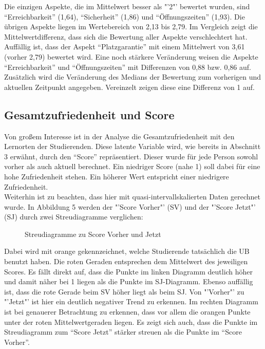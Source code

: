 \documentclass[11pt, a4paper]{article}
\begin{document}
Die einzigen Aspekte, die im Mittelwert besser als "'2"' bewertet wurden, sind “Erreichbarkeit” (1,64), “Sicherheit” (1,86) und “Öffnungszeiten” (1,93). Die übrigen Aspekte liegen im Wertebereich von 2,13 bis 2,79.
Im Vergleich zeigt die Mittelwertdifferenz, dass sich die Bewertung aller Aspekte verschlechtert hat. Auffällig ist, dass der Aspekt “Platzgarantie” mit einem Mittelwert von 3,61 (vorher 2,79) bewertet wird. Eine noch stärkere Veränderung weisen die Aspekte “Erreichbarkeit” und “Öffnungszeiten” mit Differenzen von 0,88 bzw. 0,86 auf.
Zusätzlich wird die Veränderung des Medians der Bewertung zum vorherigen und aktuellen Zeitpunkt angegeben. Vereinzelt zeigen diese eine Differenz von 1 auf.
\subsection{Gesamtzufriedenheit und Score}



Von großem Interesse ist in der Analyse die Gesamtzufriedenheit mit den Lernorten der Studierenden.
Diese latente Variable wird, wie bereits in Abschnitt 3 erwähnt, durch den “Score” repräsentiert. Dieser wurde für jede Person sowohl vorher als auch aktuell berechnet.
Ein niedriger Score (nahe 1) soll dabei für eine hohe Zufriedenheit stehen. Ein höherer Wert entspricht einer niedrigere Zufriedenheit.\\
Weiterhin ist zu beachten, dass hier mit quasi-intervallskalierten Daten gerechnet wurde.
In Abbildung 5 werden der "'Score Vorher"' (SV) und der "'Score Jetzt"' (SJ) durch zwei Streudiagramme verglichen:

\vspace{-0.5cm}
\begin{figure}[h]

\vspace{-1.8cm}
\caption{Streudiagramme zu Score Vorher und Jetzt}
\end{figure}
\vspace{0.5cm}
Dabei wird mit orange gekennzeichnet, welche Studierende tatsächlich die UB benutzt haben. Die roten Geraden entsprechen dem Mittelwert des jeweiligen Scores.
Es fällt direkt auf, dass die Punkte im linken Diagramm deutlich höher und damit näher bei 1 liegen als die Punkte im SJ-Diagramm.
Ebenso auffällig ist, dass die rote Gerade beim SV höher liegt als beim SJ.
Von "'Vorher"' zu "'Jetzt"' ist hier ein deutlich negativer Trend zu erkennen.
Im rechten Diagramm ist bei genauerer Betrachtung zu erkennen, dass vor allem die orangen Punkte unter der roten Mittelwertgeraden liegen.
Es zeigt sich auch, dass die Punkte im Streudiagramm zum “Score Jetzt” stärker streuen als die Punkte im “Score Vorher”.\\
\end{document}
